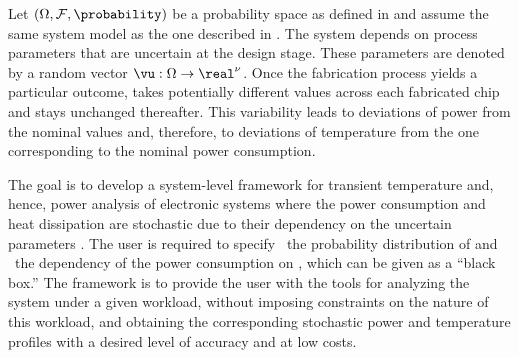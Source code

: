 Let $(\Omega, \mathcal{F}, \probability)$ be a probability space as defined in
 and assume the same system model as the one described
in . The system depends on \nu process parameters that are
uncertain at the design stage. These parameters are denoted by a random vector
$\vu: \Omega \to \real^\nu$. Once the fabrication process yields a particular
outcome, \vu takes potentially different values across each fabricated chip and
stays unchanged thereafter. This variability leads to deviations of power from
the nominal values and, therefore, to deviations of temperature from the one
corresponding to the nominal power consumption.

The goal is to develop a system-level framework for transient temperature and,
hence, power analysis of electronic systems where the power consumption and heat
dissipation are stochastic due to their dependency on the uncertain parameters
\vu. The user is required to specify \one~the probability distribution of \vu
and \two~the dependency of the power consumption on \vu, which can be given as a
``black box.'' The framework is to provide the user with the tools for analyzing
the system under a given workload, without imposing constraints on the nature of
this workload, and obtaining the corresponding stochastic power \mp and
temperature \mq profiles with a desired level of accuracy and at low costs.
